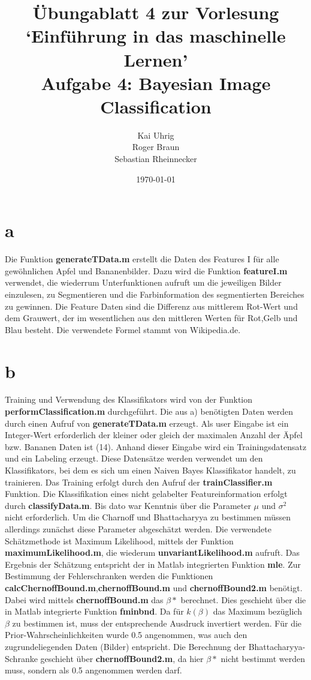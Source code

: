 \documentclass[a4paper,10pt]{article}
\title{Übungablatt 4 zur Vorlesung `Einführung in das maschinelle Lernen' \\ Aufgabe 4: Bayesian Image Classification}
\author{Kai Uhrig \\ Roger Braun \\ Sebastian Rheinnecker}
\date{\today}
\begin{document}
\maketitle
\section{a}
Die Funktion \textbf{generateTData.m} erstellt die Daten des Features I für alle gewöhnlichen Apfel und Bananenbilder. Dazu wird die Funktion \textbf{featureI.m} verwendet, die wiederrum Unterfunktionen aufruft
um die jeweiligen Bilder einzulesen, zu Segmentieren und die Farbinformation des segmentierten Bereiches zu gewinnen. Die Feature Daten sind die Differenz aus mittlerem Rot-Wert und dem Grauwert,
der im wesentlichen aus den mittleren Werten für Rot,Gelb und Blau besteht. Die verwendete Formel stammt von Wikipedia.de.

\section{b}
Training und Verwendung des Klassifikators wird von der Funktion \textbf{performClassification.m} durchgeführt. Die aus a) benötigten Daten werden durch 
einen Aufruf von \textbf{generateTData.m} erzeugt. Als user Eingabe ist ein Integer-Wert erforderlich der kleiner oder gleich der maximalen Anzahl der Äpfel
bzw. Bananen Daten ist (14). Anhand dieser Eingabe wird ein Trainingsdatensatz und ein Labeling erzeugt. Diese Datensätze werden verwendet um den Klassifikators,
bei dem es sich um einen Naiven Bayes Klassifikator handelt, zu trainieren. Das Training erfolgt durch den Aufruf der \textbf{trainClassifier.m} Funktion.
Die Klassifikation eines nicht gelabelter Featureinformation erfolgt durch \textbf{classifyData.m}.
\newline
Bis dato war Kenntnis über die Parameter $\mu$ und $\sigma^2$ nicht erforderlich. Um die Charnoff und Bhattacharyya zu bestimmen müssen allerdings zunächst
diese Parameter abgeschätzt werden. Die verwendete Schätzmethode ist Maximum Likelihood, mittels der Funktion \textbf{maximumLikelihood.m}, die wiederum
\textbf{unvariantLikelihood.m} aufruft. Das Ergebnis der Schätzung entspricht der in Matlab integrierten Funktion \textbf{mle}.
\newline
Zur Bestimmung der Fehlerschranken werden die Funktionen \textbf{calcChernoffBound.m},\textbf{chernoffBound.m} und \textbf{chernoffBound2.m} benötigt.
Dabei wird mittels \textbf{chernoffBound.m} das $\beta*$ berechnet. Dies geschieht über die in Matlab integrierte Funktion \textbf{fminbnd}. Da für 
$k(\beta)$ das Maximum bezüglich $\beta$ zu bestimmen ist, muss der entsprechende Ausdruck invertiert werden. Für die Prior-Wahrscheinlichkeiten wurde 0.5 
angenommen, was auch den zugrundeliegenden Daten (Bilder) entspricht.
\newline
Die Berechnung der Bhattacharyya-Schranke geschieht über \textbf{chernoffBound2.m}, da hier $\beta*$ nicht bestimmt werden muss, sondern als 0.5 angenommen
werden darf.
\end{document}
